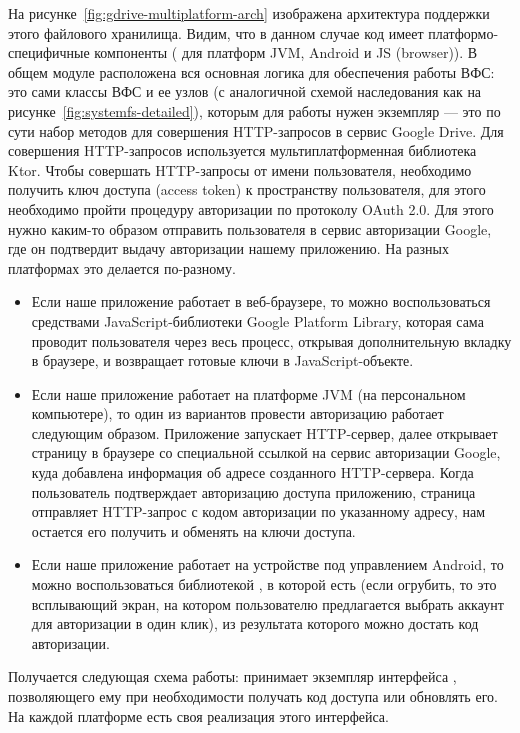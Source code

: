     На рисунке~\ref{fig:gdrive-multiplatform-arch} изображена архитектура поддержки этого файлового хранилища. Видим, что в данном случае код имеет платформо-специфичные компоненты ( для платформ JVM, Android и JS (browser)). В общем модуле расположена вся основная логика для обеспечения работы ВФС: это сами классы ВФС и ее узлов (с аналогичной схемой наследования как на рисунке~\ref{fig:systemfs-detailed}), которым для работы нужен экземпляр  --- это по сути набор методов для совершения HTTP-запросов в сервис Google Drive. Для совершения HTTP-запросов используется мультиплатформенная библиотека Ktor. Чтобы совершать HTTP-запросы от имени пользователя, необходимо получить ключ доступа (access token) к пространству пользователя, для этого необходимо пройти процедуру авторизации по протоколу OAuth 2.0\cite{google-oauth-2.0}. Для этого нужно каким-то образом отправить пользователя в сервис авторизации Google, где он подтвердит выдачу авторизации нашему приложению. На разных платформах это делается по-разному.
    \begin{itemize}
      \item Если наше приложение работает в веб-браузере, то можно воспользоваться средствами JavaScript-библиотеки Google Platform Library, которая сама проводит пользователя через весь процесс, открывая дополнительную вкладку в браузере, и возвращает готовые ключи в JavaScript-объекте.
      \item Если наше приложение работает на платформе JVM (на персональном компьютере), то один из вариантов провести авторизацию работает следующим образом. Приложение запускает HTTP-сервер, далее открывает страницу в браузере со специальной ссылкой на сервис авторизации Google, куда добавлена информация об адресе созданного HTTP-сервера. Когда пользователь подтверждает авторизацию доступа приложению, страница отправляет HTTP-запрос с кодом авторизации по указанному адресу, нам остается его получить и обменять на ключи доступа.
      \item Если наше приложение работает на устройстве под управлением Android, то можно воспользоваться библиотекой , в которой есть  (если огрубить, то это всплывающий экран, на котором пользователю предлагается выбрать аккаунт для авторизации в один клик), из результата которого можно достать код авторизации.
    \end{itemize}

    Получается следующая схема работы:  принимает экземпляр интерфейса , позволяющего ему при необходимости получать код доступа или обновлять его. На каждой платформе есть своя реализация этого интерфейса.

